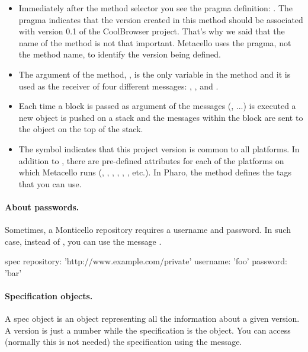 \documentclass[a4paper,10pt,twoside]{book}
\begin{document}
\begin{itemize}
\item Immediately after the method selector you see the pragma definition:  . The pragma  indicates that the version created in this method should be associated with version 0.1 of the CoolBrowser project. That's why we said that the name of the method is not that important. Metacello uses the pragma, not the method name, to identify the version being defined.

\item The argument of the method, , is the only variable in
the method and it is used as the receiver of four different messages: ,    , and  .

\item Each time a block is passed as argument of the messages (, ...) is executed a new object is pushed on a stack and the messages within the block are sent to the object on the top of the stack.

\item The symbol  indicates that this project version is common to all platforms.  In addition to , there are pre-defined attributes for each of the platforms on which Metacello runs (, , , , , , etc.). In Pharo, the method  defines the tags that you can use. 
\end{itemize}

\paragraph{About passwords.} Sometimes, a Monticello repository requires a username and password. In such case, instead of , you can use the message .

\begin{code}{}
         spec repository: 'http://www.example.com/private' username: 'foo' password: 'bar' 
\end{code}


\paragraph{Specification objects.}
A spec object is an object representing all the information about a given version. A version is just a number 
while the specification is the object. You can access (normally this is not needed) the specification using the  message. 
\end{document}
